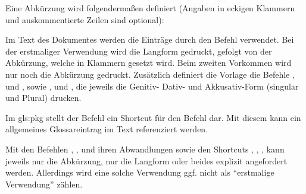 Eine Abkürzung wird folgendermaßen definiert (Angaben in eckigen Klammern und auskommentierte Zeilen sind optional):
\begin{latex}[caption={Definition einer Abkürzung},label={lst:AcronymEntry}]
\end{latex}

Im Text des Dokumentes werden die Einträge durch den Befehl  verwendet.
Bei der erstmaliger Verwendung wird die Langform gedruckt, gefolgt von der Abkürzung, welche in Klammern gesetzt wird.
Beim zweiten Vorkommen wird nur noch die Abkürzung gedruckt.
Zusätzlich definiert die Vorlage die Befehle
,  und , sowie
,  und ,
die jeweils die Genitiv- Dativ- und Akkusativ-Form (singular und Plural) drucken.

Im \gls{gls:pkg}  stellt der Befehl  ein Shortcut für den Befehl  dar.
Mit diesem kann ein allgemeines Glossareintrag im Text referenziert werden.

Mit den Befehlen
, , 
und ihren Abwandlungen sowie den Shortcuts
, , ,
kann jeweils nur die Abkürzung, nur die Langform oder beides explizit angefordert werden.
Allerdings wird eine solche Verwendung ggf. nicht als \enquote{erstmalige Verwendung} zählen.

